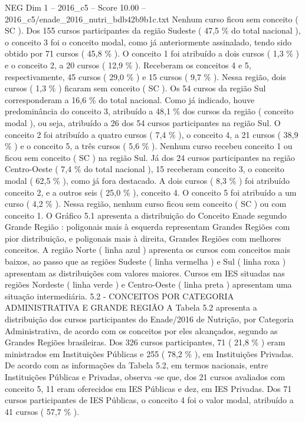 \begin{textsample}{NEG Dim 1 – 2016\_c5 – Score 10.00 – 2016\_c5/enade\_2016\_nutri\_bdb42b9b1c.txt}
Nenhum curso ficou sem conceito ( SC ).
Dos 155 cursos participantes da região Sudeste ( 47,5 \% do total nacional ), o conceito 3 foi o conceito modal, como já anteriormente assinalado, tendo sido obtido por 71 cursos ( 45,8 \% ).
O conceito 1 foi atribuído a dois cursos ( 1,3 \% ) e o conceito 2, a 20 cursos ( 12,9 \% ).
Receberam os conceitos 4 e 5, respectivamente, 45 cursos ( 29,0 \% ) e 15 cursos ( 9,7 \% ).
Nessa região, dois cursos ( 1,3 \% ) ficaram sem conceito ( SC ).
Os 54 cursos da região Sul corresponderam a 16,6 \% do total nacional.
Como já indicado, houve predominância do conceito 3, atribuído a 48,1 \% dos cursos da região ( conceito modal ), ou seja, atribuído a 26 dos 54 cursos participantes na região Sul.
O conceito 2 foi atribuído a quatro cursos ( 7,4 \% ), o conceito 4, a 21 cursos ( 38,9 \% ) e o conceito 5, a três cursos ( 5,6 \% ).
Nenhum curso recebeu conceito 1 ou ficou sem conceito ( SC ) na região Sul.
Já dos 24 cursos participantes na região Centro-Oeste ( 7,4 \% do total nacional ), 15 receberam conceito 3, o conceito modal ( 62,5 \% ), como já fora destacado.
A dois cursos ( 8,3 \% ) foi atribuído conceito 2, e a outros seis ( 25,0 \% ), conceito 4.
O conceito 5 foi atribuído a um curso ( 4,2 \% ).
Nessa região, nenhum curso ficou sem conceito ( SC ) ou com conceito 1.
O Gráfico 5.1 apresenta a distribuição do Conceito Enade segundo Grande Região : poligonais mais à esquerda representam Grandes Regiões com pior distribuição, e poligonais mais à direita, Grandes Regiões com melhores conceitos.
A região Norte ( linha azul ) apresenta os cursos com conceitos mais baixos, ao passo que as regiões Sudeste ( linha vermelha ) e Sul ( linha roxa ) apresentam as distribuições com valores maiores.
Cursos em IES situadas nas regiões Nordeste ( linha verde ) e Centro-Oeste ( linha preta ) apresentam uma situação intermediária. 5.2 - CONCEITOS POR CATEGORIA ADMINISTRATIVA E GRANDE REGIÃO A Tabela 5.2 apresenta a distribuição dos cursos participantes do Enade/2016 de Nutrição, por Categoria Administrativa, de acordo com os conceitos por eles alcançados, segundo as Grandes Regiões brasileiras.
Dos 326 cursos participantes, 71 ( 21,8 \% ) eram ministrados em Instituições Públicas e 255 ( 78,2 \% ), em Instituições Privadas.
De acordo com as informações da Tabela 5.2, em termos nacionais, entre Instituições Públicas e Privadas, observa -se que, dos 21 cursos avaliados com conceito 5, 11 eram oferecidos em IES Públicas e dez, em IES Privadas.
Dos 71 cursos participantes de IES Públicas, o conceito 4 foi o valor modal, atribuído a 41 cursos ( 57,7 \% ).

\end{textsample}

